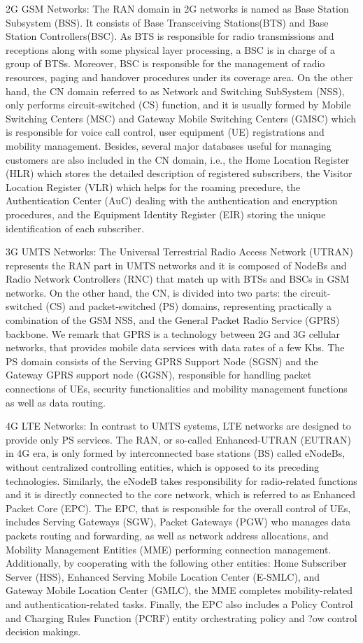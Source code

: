 2G GSM Networks: The RAN domain in 2G networks is named as Base Station Subsystem (BSS). It consists of Base Transceiving Stations(BTS) and Base Station Controllers(BSC). As BTS is responsible for radio transmissions and receptions along with some physical layer processing, a BSC is in charge of a group of BTSs. Moreover, BSC is responsible for the management of radio resources, paging and handover procedures under its coverage area. On the other hand, the CN domain referred to as Network and Switching SubSystem (NSS), only performs circuit-switched (CS) function, and it is usually formed by Mobile Switching Centers (MSC) and Gateway Mobile Switching Centers (GMSC) which is responsible for voice call control, user equipment (UE) registrations and mobility management. Besides, several major databases useful for managing customers are also included in the CN domain, i.e., the Home Location Register (HLR) which stores the detailed description of registered subscribers, the Visitor Location Register (VLR) which helps for the roaming precedure, the Authentication Center (AuC) dealing with the authentication and encryption procedures, and the Equipment Identity Register (EIR) storing the unique identification of each subscriber.

3G UMTS Networks: The Universal Terrestrial Radio Access Network (UTRAN) represents the RAN part in UMTS networks and it is composed of NodeBs and Radio Network Controllers (RNC) that match up with BTSs and BSCs in GSM networks. On the other hand, the CN, is divided into two parts: the circuit-switched (CS) and packet-switched (PS) domains, representing practically a combination of the GSM NSS, and the General Packet Radio Service (GPRS) backbone. We remark that GPRS is a technology between 2G and 3G cellular networks, that provides mobile data services with data rates of a few Kb\/s. The PS domain consists of the Serving GPRS Support Node (SGSN) and the Gateway GPRS support node (GGSN), responsible for handling packet connections of UEs, security functionalities and mobility management functions as well as data routing.

4G LTE Networks: In contrast to UMTS systems, LTE networks are designed to provide only PS services. The RAN, or so-called Enhanced-UTRAN (EUTRAN) in 4G era, is only formed by interconnected base stations (BS) called eNodeBs, without centralized controlling entities, which is opposed to its preceding technologies. Similarly, the eNodeB takes responsibility for radio-related functions and it is directly connected to the core network, which is referred to as Enhanced Packet Core (EPC). The EPC, that is responsible for the overall control of UEs, includes Serving Gateways (SGW), Packet Gateways (PGW) who manages data packets routing and forwarding, as well as network address allocations, and Mobility Management Entities (MME) performing connection management. Additionally, by cooperating with the following other entities: Home Subscriber Server (HSS), Enhanced Serving Mobile Location Center (E-SMLC), and Gateway Mobile Location Center (GMLC), the MME completes mobility-related and authentication-related tasks. Finally, the EPC also includes a Policy Control and Charging Rules Function (PCRF) entity orchestrating policy and ?ow control decision makings.


